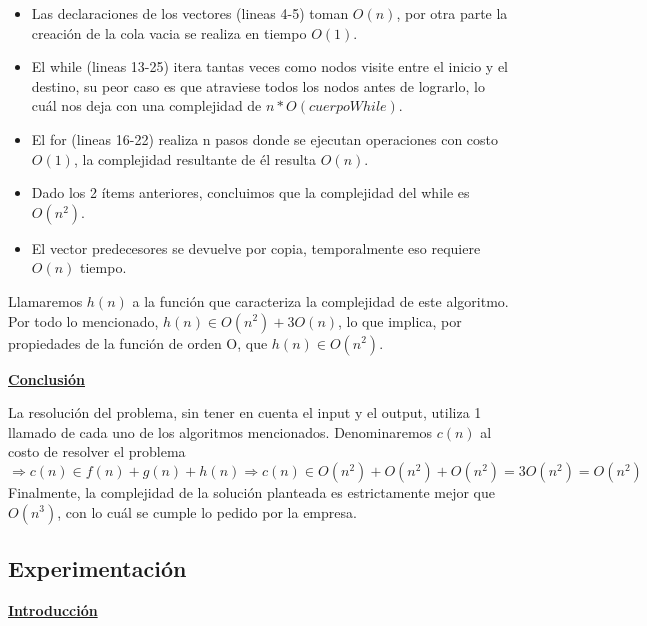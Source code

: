 \documentclass[10pt,a4paper]{article}
\begin{document}
\begin{itemize}
\item Las declaraciones de los vectores (lineas 4-5) toman $O(n)$, por otra parte la creación de la cola vacia se realiza en tiempo $O(1)$.
\item El while (lineas 13-25) itera tantas veces como nodos visite entre el inicio y el destino, su peor caso es que atraviese todos los nodos antes de lograrlo, lo cuál nos deja con una complejidad de $n*O(cuerpoWhile)$.
\item El for (lineas 16-22) realiza n pasos donde se ejecutan operaciones con costo $O(1)$, la complejidad resultante de él resulta $O(n)$.
\item Dado los 2 ítems anteriores, concluimos que la complejidad del while es $O(n^2)$.
\item El vector predecesores se devuelve por copia, temporalmente eso requiere $O(n)$ tiempo.
\end{itemize}

Llamaremos $h(n)$ a la función que caracteriza la complejidad de este algoritmo. Por todo lo mencionado, $h(n) \in O(n^2) + 3O(n)$, lo que implica, por propiedades de la función de orden O, que $h(n) \in O(n^2)$.

\noindent \textbf{\underline{Conclusión}}

La resolución del problema, sin tener en cuenta el input y el output, utiliza 1 llamado de cada uno de los algoritmos mencionados. Denominaremos $c(n)$ al costo de resolver el problema $\Rightarrow c(n) \in f(n) + g(n) + h(n) \Rightarrow c(n) \in O(n^2) + O(n^2) + O(n^2) = 3O(n^2) = O(n^2)$
Finalmente, la complejidad de la solución planteada es estrictamente mejor que $O(n^3)$, con lo cuál se cumple lo pedido por la empresa.

\newpage
\subsection{Experimentación}

\noindent \textbf{\underline{Introducción}}
\end{document}
